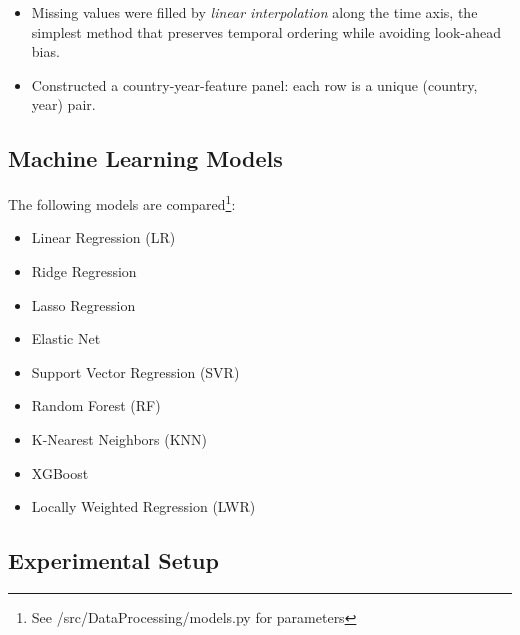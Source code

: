 \documentclass[12pt]{article}
\begin{document}
\begin{itemize}
    \item Missing values were filled by \emph{linear interpolation} along the time axis, the simplest method that preserves temporal ordering while avoiding look-ahead bias.
    \item Constructed a country-year-feature panel: each row is a unique (country, year) pair.
\end{itemize}



\subsection{Machine Learning Models}

The following models are compared\footnote{See /src/DataProcessing/models.py for parameters}:
\begin{itemize}
    \item Linear Regression (LR)
    \item Ridge Regression
    \item Lasso Regression
    \item Elastic Net
    \item Support Vector Regression (SVR)
    \item Random Forest (RF)
    \item K-Nearest Neighbors (KNN)
    \item XGBoost
    \item Locally Weighted Regression (LWR)
\end{itemize}

\subsection{Experimental Setup}
\end{document}
